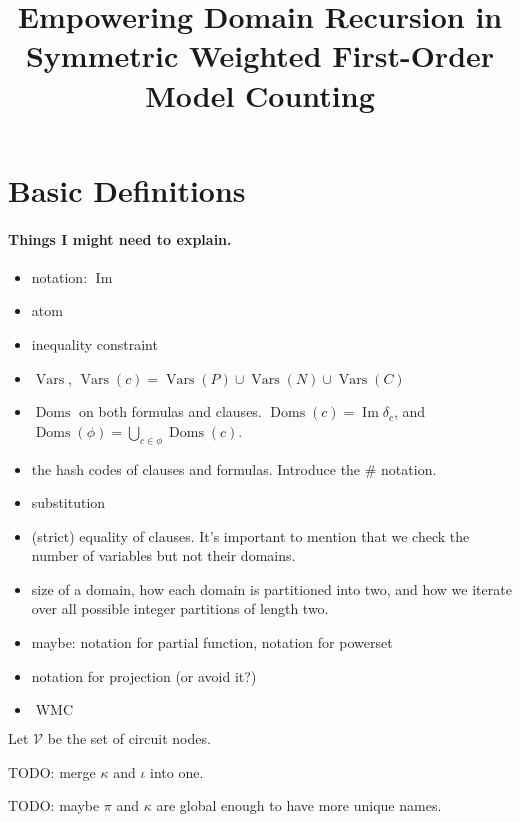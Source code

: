 \documentclass{article}
\title{Empowering Domain Recursion in Symmetric Weighted First-Order Model Counting}
\theoremstyle{definition}
\DeclareMathOperator{\Imm}{Im}
\DeclareMathOperator{\Doms}{Doms}
\DeclareMathOperator{\Vars}{Vars}
\DeclareMathOperator{\WMC}{WMC}
\begin{document}
\maketitle

\section{Basic Definitions}

\paragraph{Things I might need to explain.}
\begin{itemize}
\item notation: $\Imm$
\item atom
\item inequality constraint
\item $\Vars$, $\Vars(c) = \Vars(P) \cup \Vars(N) \cup \Vars(C)$
\item $\Doms$ on both formulas and clauses. $\Doms(c) = \Imm \delta_c$, and $\Doms(\phi) = \bigcup_{c \in \phi} \Doms(c)$.
\item the hash codes of clauses and formulas. Introduce the $\#$ notation.
\item substitution
\item (strict) equality of clauses. It's important to mention that we check the number of variables but not their domains.
\item size of a domain, how each domain is partitioned into two, and how we iterate over all possible integer partitions of length two.
\item maybe: notation for partial function, notation for powerset
\item notation for projection (or avoid it?)
\item $\WMC$
\end{itemize}

Let $\mathscr{V}$ be the set of circuit nodes.

TODO: merge $\kappa$ and $\iota$ into one.

TODO: maybe $\pi$ and $\kappa$ are global enough to have more unique names.
\end{document}
